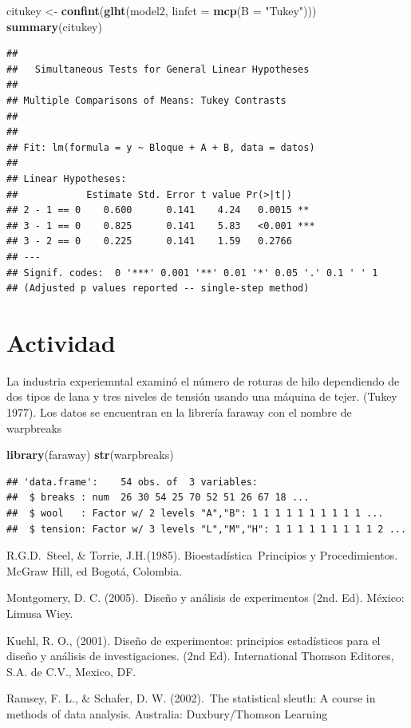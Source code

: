 \documentclass[]{book}
\newenvironment{Shaded}{\begin{snugshade}}{\end{snugshade}}
\newcommand{\KeywordTok}[1]{\textcolor[rgb]{0.13,0.29,0.53}{\textbf{#1}}}
\newcommand{\DataTypeTok}[1]{\textcolor[rgb]{0.13,0.29,0.53}{#1}}
\newcommand{\StringTok}[1]{\textcolor[rgb]{0.31,0.60,0.02}{#1}}
\newcommand{\NormalTok}[1]{#1}
\begin{document}
\begin{Shaded}
\begin{Highlighting}[]
\NormalTok{citukey <-}\StringTok{ }\KeywordTok{confint}\NormalTok{(}\KeywordTok{glht}\NormalTok{(model2, }\DataTypeTok{linfct =} \KeywordTok{mcp}\NormalTok{(}\DataTypeTok{B =} \StringTok{"Tukey"}\NormalTok{)))}
\KeywordTok{summary}\NormalTok{(citukey)}
\end{Highlighting}
\end{Shaded}

\begin{verbatim}
## 
##   Simultaneous Tests for General Linear Hypotheses
## 
## Multiple Comparisons of Means: Tukey Contrasts
## 
## 
## Fit: lm(formula = y ~ Bloque + A + B, data = datos)
## 
## Linear Hypotheses:
##            Estimate Std. Error t value Pr(>|t|)    
## 2 - 1 == 0    0.600      0.141    4.24   0.0015 ** 
## 3 - 1 == 0    0.825      0.141    5.83   <0.001 ***
## 3 - 2 == 0    0.225      0.141    1.59   0.2766    
## ---
## Signif. codes:  0 '***' 0.001 '**' 0.01 '*' 0.05 '.' 0.1 ' ' 1
## (Adjusted p values reported -- single-step method)
\end{verbatim}

\section{Actividad}\label{actividad-5}

La industria experiemntal examinó el número de roturas de hilo
dependiendo de dos tipos de lana y tres niveles de tensión usando una
máquina de tejer. (Tukey 1977). Los datos se encuentran en la librería
faraway con el nombre de warpbreaks

\begin{Shaded}
\begin{Highlighting}[]
\KeywordTok{library}\NormalTok{(faraway)}
\KeywordTok{str}\NormalTok{(warpbreaks)}
\end{Highlighting}
\end{Shaded}

\begin{verbatim}
## 'data.frame':    54 obs. of  3 variables:
##  $ breaks : num  26 30 54 25 70 52 51 26 67 18 ...
##  $ wool   : Factor w/ 2 levels "A","B": 1 1 1 1 1 1 1 1 1 1 ...
##  $ tension: Factor w/ 3 levels "L","M","H": 1 1 1 1 1 1 1 1 1 2 ...
\end{verbatim}

R.G.D.~Steel, \& Torrie, J.H.(1985). Bioestadística~Principios y
Procedimientos. McGraw Hill, ed Bogotá, Colombia.

Montgomery, D. C. (2005).~Diseño y análisis de experimentos (2nd. Ed).
México: Limusa Wiey.

Kuehl, R. O., (2001). Diseño de experimentos: principios estadísticos
para el diseño y análisis de investigaciones. (2nd Ed). International
Thomson Editores, S.A. de C.V., Mexico, DF.

Ramsey, F. L., \& Schafer, D. W. (2002).~The statistical sleuth: A
course in methods of data analysis. Australia: Duxbury/Thomson Learning


\end{document}
